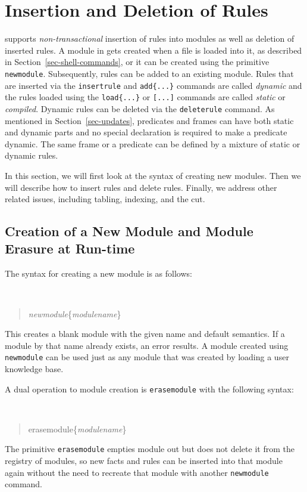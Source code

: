 \documentclass[11pt]{article}
\newcommand{\ERGO}{\mbox{\smaller{\ensuremath{\cal{E}}\smaller{{\sc{RGO}}}}}\xspace}
\newcommand{\FLSYSTEM}{\ERGO}
\begin{document}
\section{Insertion and Deletion of Rules}
\label{sec-rule-update}

\FLSYSTEM supports \emph{non-transactional} insertion of rules into modules as
well as deletion of inserted rules.  A module in \FLSYSTEM gets created when a
file is loaded into it, as described in
Section~\ref{sec-shell-commands}, or it can be created using the primitive
{\tt newmodule}. Subsequently, rules can be added to an existing module.
Rules that are inserted via the {\tt insertrule} and {\tt add\{...\}} commands
are called \emph{dynamic} and the rules loaded using the {\tt load\{...\}} or
{\tt [...]} commands are called \emph{static} or \emph{compiled}.  Dynamic
rules can be deleted via the {\tt deleterule} command. As mentioned in
Section~\ref{sec-updates}, \FLSYSTEM predicates and frames can have both
static and dynamic parts and no special declaration is required to make a
predicate dynamic. The same frame or a predicate can be defined by a
mixture of static or dynamic rules.

In this section, we will first look at the syntax of creating new
modules.  Then we will describe how to insert rules and delete
rules. Finally, we address other related issues, including tabling,
indexing, and the cut.


\subsection{Creation of a New Module and Module Erasure at Run-time}


The syntax for creating a new module is as follows:
{\tt
\begin{quote}
\emph{newmodule}\{\emph{modulename}\}
\end{quote}
}
\noindent
This creates a blank module with the given name and default semantics.  If
a module by that name already exists, an error results.  A module created
using {\tt newmodule} can be used just as any module that
was created by loading a user knowledge base.

A dual operation to module creation
is \texttt{erasemodule} with the following syntax:
{\tt
\begin{quote}
erasemodule\{\emph{modulename}\}
\end{quote}
}
The primitive \texttt{erasemodule} empties module out but does not delete
it from the registry of modules, so new facts and rules can be inserted
into that module again without the need to recreate that module with
another \texttt{newmodule} command. 
\end{document}

